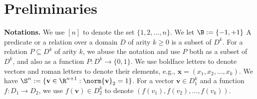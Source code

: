 \section{Preliminaries}
\label{sec:prelims}


\noindent \textbf{Notations.} We use $[n]$ to denote the set $\{1,2,\ldots, n\}$. {We let $\B := \{-1,+1\}$} A predicate or a relation over a domain $D$ of arity $k {\ge 0}$ is a subset of $D^k$.
For a relation $P \subseteq {D}^k$ of arity $k$, we abuse the notation and use $P$ both as a subset of ${D}^k$, and also as a function $P:{D}^k \rightarrow \{0,1\}$. We use boldface letters to denote vectors and roman letters to denote their elements, e.g., $\textbf{x}=(x_1, x_2,\ldots,x_k)$. We have $\S^n := \{ \textbf{v} \in \R^{n+1}: \norm{\textbf{v}}_2=1\}$.
For a vector $\textbf{v} \in D_1^k$ and a function $f:D_1\rightarrow D_2$, we use $f(\textbf{v})\in D_2^k$ to denote $(f(v_1),f(v_2),\ldots,f(v_k))$.
